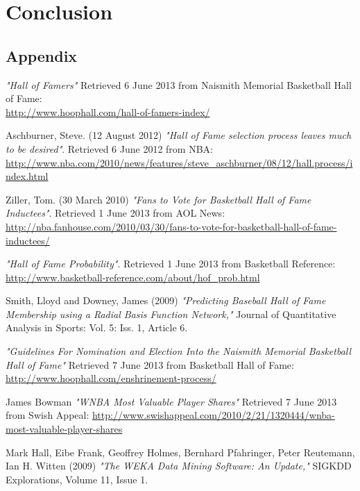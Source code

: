 \documentclass[paper=a4, fontsize=11pt]{scrartcl} %
\numberwithin{equation}{section} %
\numberwithin{figure}{section} %
\numberwithin{table}{section} %
\begin{document}
\section{Conclusion}

\begin{appendix}
\section{Appendix}

\end{appendix}

\begin{thebibliography}{9}

	\emph{"Hall of Famers"}
	Retrieved 6 June 2013 from Naismith Memorial Basketball Hall of Fame:\\
	\url{http://www.hoophall.com/hall-of-famers-index/} 

Aschburner, Steve. (12 August 2012)
\emph{"Hall of Fame selection process leaves much to be desired"}.
Retrieved 6 June 2012 from NBA:
\url{http://www.nba.com/2010/news/features/steve_aschburner/08/12/hall.process/index.html}   

   Ziller, Tom. (30 March 2010)
  \emph{"Fans to Vote for Basketball Hall of Fame Inductees"}.
   Retrieved 1 June 2013 from AOL News:
   \url{http://nba.fanhouse.com/2010/03/30/fans-to-vote-for-basketball-hall-of-fame-inductees/}
   
  \emph{"Hall of Fame Probability"}.
   Retrieved 1 June 2013 from Basketball Reference:\\
   \url{http://www.basketball-reference.com/about/hof_prob.html}  
 
Smith, Lloyd and Downey, James (2009)
\emph{"Predicting Baseball Hall of Fame Membership using a Radial Basis Function Network,"}
Journal of Quantitative Analysis in Sports: Vol. 5: Iss. 1, Article 6.
 
 \emph{"Guidelines For Nomination and Election Into the Naismith Memorial Basketball Hall of Fame"}
 Retrieved 7 June 2013 from Basketball Hall of Fame:
 \url{http://www.hoophall.com/enshrinement-process/}
 
 James Bowman
 \emph{"WNBA Most Valuable Player Shares"}
 Retrieved 7 June 2013 from Swish Appeal:
 \url{http://www.swishappeal.com/2010/2/21/1320444/wnba-most-valuable-player-shares}
 
 Mark Hall, Eibe Frank, Geoffrey Holmes, Bernhard Pfahringer, Peter Reutemann, Ian H. Witten (2009)
 \emph{"The WEKA Data Mining Software: An Update,"} 
 SIGKDD Explorations, Volume 11, Issue 1.
 

\end{thebibliography}
\end{document}
